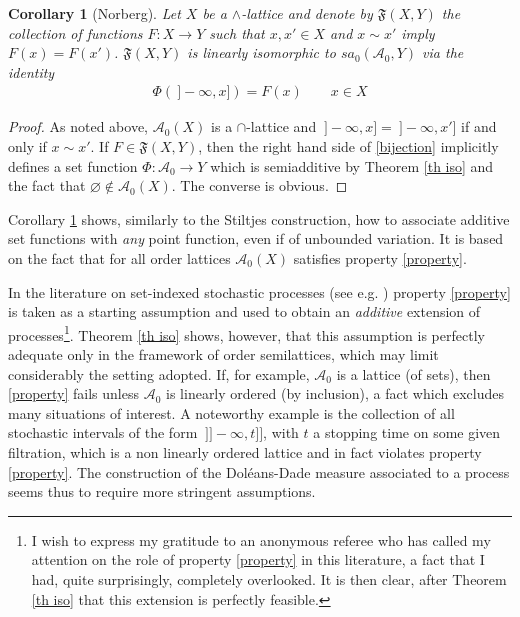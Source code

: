 \documentclass[11pt]{amsart}
\theoremstyle{plain}
\newtheorem{corollary}{Corollary}
\begin{document}
\begin{corollary}[Norberg]
\label{cor norberg}
Let $X$ be a $\wedge$-lattice and denote by $\mathfrak F(X,Y)$ the collection 
of functions $F:X\to Y$ such that $x,x'\in X$ and $x\sim x'$ imply $F(x)=F(x')$. 
$\mathfrak F(X,Y)$ is linearly isomorphic to $sa_0({\mathscr{A}}_0,Y)$ via the identity 
\begin{align} 
\label{bijection}
\Phi({\ ]-\infty,{x}]})=F(x)\qquad x\in X
\end{align}
\end{corollary}

\begin{proof} 
As noted above, ${\mathscr{A}}_0(X)$ is a $\cap$-lattice and ${\ ]-\infty,{x}]}={\ ]-\infty,{x'}]}$ if and only if 
$x\sim x'$. If $F\in\mathfrak F(X,Y)$, then the right hand side of \eqref{bijection} 
implicitly defines a set function $\Phi:{\mathscr{A}}_0\to Y$ which is semiadditive by Theorem 
\ref{th iso} and the fact that ${\varnothing}\notin{\mathscr{A}}_0(X)$. The converse is obvious.
\end{proof}

Corollary \ref{cor norberg} shows, similarly to the Stiltjes construction, how to 
associate additive set functions with \textit{any} point function, even if of unbounded 
variation. It is based on the fact that for all order lattices ${\mathscr{A}}_0(X)$ satisfies property
\eqref{property}. 

In the literature on set-indexed stochastic processes (see e.g. \cite{dozzi}) property 
\eqref{property} is taken as a starting assumption and used to obtain an \textit{additive}
extension of processes\footnote{I wish to express my gratitude to an anonymous referee who has called 
my attention on the role of property \eqref{property} in this literature, a fact that 
I had, quite surprisingly, completely overlooked. It is then clear, after Theorem 
\ref{th iso} that this extension is perfectly feasible.}. 
Theorem \ref{th iso} shows, however, that this assumption is perfectly adequate 
only in the framework of order semilattices, which may limit considerably the setting
adopted. If, for example, ${\mathscr{A}}_0$ is a lattice (of sets), then \eqref{property} fails 
unless ${\mathscr{A}}_0$ is linearly ordered (by inclusion), a fact which excludes many 
situations of interest. A noteworthy example is the collection of all stochastic intervals 
of the form ${\ ]]-\infty,t]]}$, with $t$ a stopping time on some given filtration, which is a 
non linearly ordered lattice and in fact violates property \eqref{property}. The 
construction of the Dol\'eans-Dade measure associated to a process seems thus 
to require more stringent assumptions.
\end{document}
